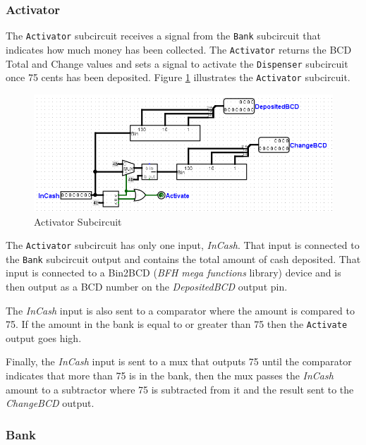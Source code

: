 \subsubsection{Activator}

The \lstinline[columns=fixed]|Activator| subcircuit receives a signal from the \lstinline[columns=fixed]|Bank| subcircuit that indicates how much money has been collected. The \lstinline[columns=fixed]|Activator| returns the \ac{BCD} Total and Change values and sets a signal to activate the \lstinline[columns=fixed]|Dispenser| subcircuit once 75 cents has been deposited. Figure \ref{fig:05-02} illustrates the \lstinline[columns=fixed]|Activator| subcircuit.

\begin{figure}[H]
	\centering
	\includegraphics[width=\maxwidth{.95\linewidth}]{gfx/05-02}
	\caption{Activator Subcircuit}
	\label{fig:05-02}
\end{figure}

The \lstinline[columns=fixed]|Activator| subcircuit has only one input, \textit{InCash}. That input is connected to the \lstinline[columns=fixed]|Bank| subcircuit output and contains the total amount of cash deposited. That input is connected to a Bin2BCD (\textit{BFH mega functions} library) device and is then output as a \ac{BCD} number on the \textit{DepositedBCD} output pin.

The \textit{InCash} input is also sent to a comparator where the amount is compared to 75. If the amount in the bank is equal to or greater than 75 then the \lstinline[columns=fixed]|Activate| output goes high.

Finally, the \textit{InCash} input is sent to a mux that outputs 75 until the comparator indicates that more than 75 is in the bank, then the mux passes the \textit{InCash} amount to a subtractor where 75 is subtracted from it and the result sent to the \textit{ChangeBCD} output.

\subsubsection{Bank}

